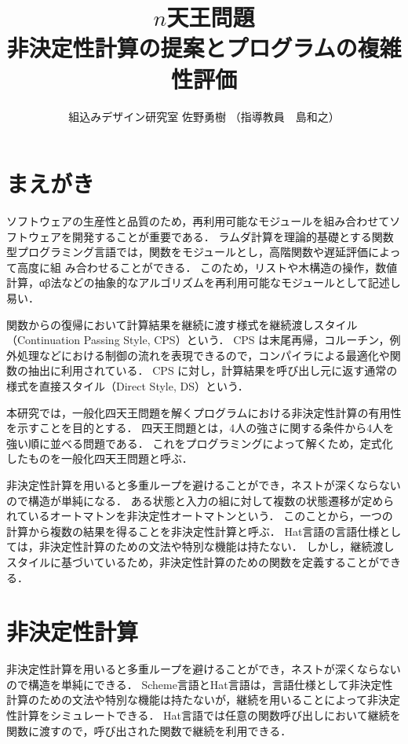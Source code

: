 \documentclass[10pt,a4j,twocolumn,oneside]{jsarticle}
\title{
{\bf $n$天王問題 \\ 非決定性計算の提案とプログラムの複雑性評価}
}
\author{組込みデザイン研究室  佐野勇樹 \quad （指導教員　島和之）}
\date{}
\begin{document}
\maketitle
\thispagestyle{empty}

\section{まえがき}

ソフトウェアの生産性と品質のため，再利用可能なモジュールを組み合わせてソフトウェアを開発することが重要である．
ラムダ計算を理論的基礎とする関数型プログラミング言語では，関数をモジュールとし，高階関数や遅延評価によって高度に組
み合わせることができる．
このため，リストや木構造の操作，数値計算，αβ法などの抽象的なアルゴリズムを再利用可能なモジュールとして記述し易い\cite{Hughes1989}．

関数からの復帰において計算結果を継続に渡す様式を継続渡しスタイル（Continuation Passing Style, CPS）という\cite{Sussman1998,Reynolds1993}．
CPS は末尾再帰，コルーチン，例外処理などにおける制御の流れを表現できるので，コンパイラによる最適化や関数の抽出に利用されている\cite{Sumii2004,Hirota2013,Steele1978,Haynes1984}．
CPS に対し，計算結果を呼び出し元に返す通常の様式を直接スタイル（Direct Style, DS）という．

本研究では，一般化四天王問題を解くプログラムにおける非決定性計算の有用性を示すことを目的とする．
四天王問題とは，4人の強さに関する条件から4人を強い順に並べる問題である．
これをプログラミングによって解くため，定式化したものを一般化四天王問題と呼ぶ．

非決定性計算を用いると多重ループを避けることができ，ネストが深くならないので構造が単純になる．
ある状態と入力の組に対して複数の状態遷移が定められているオートマトンを非決定性オートマトンという\cite{Fujiwara2015}．
このことから，一つの計算から複数の結果を得ることを非決定性計算と呼ぶ．
Hat言語の言語仕様としては，非決定性計算のための文法や特別な機能は持たない．
しかし，継続渡しスタイルに基づいているため，非決定性計算のための関数を定義することができる．

\section{非決定性計算}

非決定性計算を用いると多重ループを避けることができ，ネストが深くならないので構造を単純にできる．
Scheme言語とHat言語は，言語仕様として非決定性計算のための文法や特別な機能は持たないが，継続を用いることによって非決定性計算をシミュレートできる．
Hat言語では任意の関数呼び出しにおいて継続を関数に渡すので，呼び出された関数で継続を利用できる．
\end{document}
